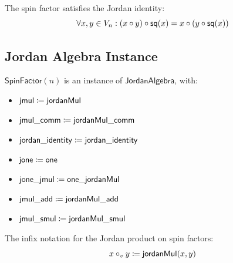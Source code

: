 \begin{theorem}
The spin factor satisfies the Jordan identity:
\[ \forall x, y \in V_n : (x \circ y) \circ \mathsf{sq}(x) = x \circ (y \circ \mathsf{sq}(x)) \]
\end{theorem}

\subsection{Jordan Algebra Instance}

\begin{proposition}[jordanAlgebra]
$\mathsf{SpinFactor}(n)$ is an instance of $\mathsf{JordanAlgebra}$, with:
\begin{itemize}
  \item $\mathsf{jmul} \coloneqq \mathsf{jordanMul}$
  \item $\mathsf{jmul\_comm} \coloneqq \mathsf{jordanMul\_comm}$
  \item $\mathsf{jordan\_identity} \coloneqq \mathsf{jordan\_identity}$
  \item $\mathsf{jone} \coloneqq \mathsf{one}$
  \item $\mathsf{jone\_jmul} \coloneqq \mathsf{one\_jordanMul}$
  \item $\mathsf{jmul\_add} \coloneqq \mathsf{jordanMul\_add}$
  \item $\mathsf{jmul\_smul} \coloneqq \mathsf{jordanMul\_smul}$
\end{itemize}
\end{proposition}

\begin{definition}[Notation]
The infix notation for the Jordan product on spin factors:
\[ x \circ_v y \coloneqq \mathsf{jordanMul}(x, y) \]
\end{definition}
